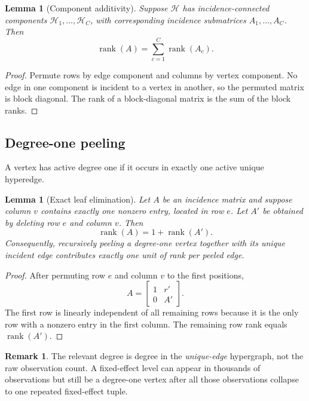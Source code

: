 \documentclass[11pt]{article}
\newtheorem{lemma}[theorem]{Lemma}
\theoremstyle{definition}
\newtheorem{remark}[theorem]{Remark}
\newcommand{\rank}{\operatorname{rank}}
\newcommand{\1}{\mathbf{1}}
\newcommand{\HH}{\mathcal{H}}
\begin{document}
\begin{lemma}[Component additivity]\label{lem:components}
Suppose $\HH$ has incidence-connected components $\HH_1,\ldots,\HH_C$, with corresponding incidence submatrices $A_1,\ldots,A_C$. Then
\begin{equation}
  \rank(A)=\sum_{c=1}^{C}\rank(A_c).
\end{equation}
\end{lemma}

\begin{proof}
Permute rows by edge component and columns by vertex component. No edge in one component is incident to a vertex in another, so the permuted matrix is block diagonal. The rank of a block-diagonal matrix is the sum of the block ranks.
\end{proof}

\subsection{Degree-one peeling}

A vertex has active degree one if it occurs in exactly one active unique hyperedge.

\begin{lemma}[Exact leaf elimination]\label{lem:peel}
Let $A$ be an incidence matrix and suppose column $v$ contains exactly one nonzero entry, located in row $e$. Let $A'$ be obtained by deleting row $e$ and column $v$. Then
\begin{equation}
  \rank(A)=1+\rank(A').
  \label{eq:peel}
\end{equation}
Consequently, recursively peeling a degree-one vertex together with its unique incident edge contributes exactly one unit of rank per peeled edge.
\end{lemma}

\begin{proof}
After permuting row $e$ and column $v$ to the first positions,
\begin{equation}
  A=\begin{bmatrix}1&r'\\0&A'\end{bmatrix}.
\end{equation}
The first row is linearly independent of all remaining rows because it is the only row with a nonzero entry in the first column. The remaining row rank equals $\rank(A')$.
\end{proof}

\begin{remark}
The relevant degree is degree in the \emph{unique-edge} hypergraph, not the raw observation count. A fixed-effect level can appear in thousands of observations but still be a degree-one vertex after all those observations collapse to one repeated fixed-effect tuple.
\end{remark}
\end{document}
